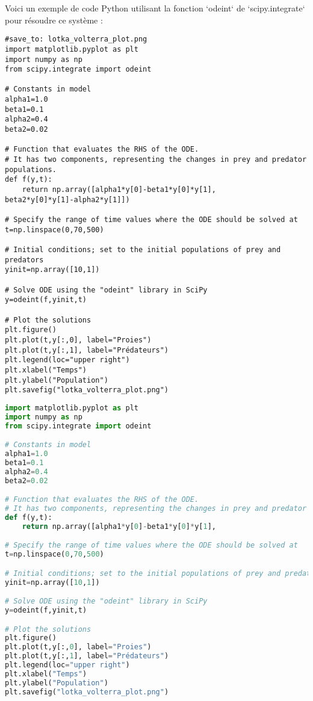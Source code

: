 \documentclass{article}
\begin{document}
Voici un exemple de code Python utilisant la fonction `odeint` de `scipy.integrate` pour résoudre ce système :
\begin{verbatim}
#save_to: lotka_volterra_plot.png
import matplotlib.pyplot as plt
import numpy as np
from scipy.integrate import odeint

# Constants in model
alpha1=1.0
beta1=0.1
alpha2=0.4
beta2=0.02

# Function that evaluates the RHS of the ODE.
# It has two components, representing the changes in prey and predator populations.
def f(y,t):
    return np.array([alpha1*y[0]-beta1*y[0]*y[1],                      beta2*y[0]*y[1]-alpha2*y[1]])

# Specify the range of time values where the ODE should be solved at
t=np.linspace(0,70,500)

# Initial conditions; set to the initial populations of prey and predators
yinit=np.array([10,1])

# Solve ODE using the "odeint" library in SciPy
y=odeint(f,yinit,t)

# Plot the solutions
plt.figure()
plt.plot(t,y[:,0], label="Proies")
plt.plot(t,y[:,1], label="Prédateurs")
plt.legend(loc="upper right")
plt.xlabel("Temps")
plt.ylabel("Population")
plt.savefig("lotka_volterra_plot.png")
\end{verbatim}
\begin{lstlisting}[language=Python, caption=Code Python pour le modèle Lotka-Volterra, label=code:lotka_volterra]
import matplotlib.pyplot as plt
import numpy as np
from scipy.integrate import odeint

# Constants in model
alpha1=1.0
beta1=0.1
alpha2=0.4
beta2=0.02

# Function that evaluates the RHS of the ODE.
# It has two components, representing the changes in prey and predator populations.
def f(y,t):
    return np.array([alpha1*y[0]-beta1*y[0]*y[1],                      beta2*y[0]*y[1]-alpha2*y[1]])

# Specify the range of time values where the ODE should be solved at
t=np.linspace(0,70,500)

# Initial conditions; set to the initial populations of prey and predators
yinit=np.array([10,1])

# Solve ODE using the "odeint" library in SciPy
y=odeint(f,yinit,t)

# Plot the solutions
plt.figure()
plt.plot(t,y[:,0], label="Proies")
plt.plot(t,y[:,1], label="Prédateurs")
plt.legend(loc="upper right")
plt.xlabel("Temps")
plt.ylabel("Population")
plt.savefig("lotka_volterra_plot.png")
\end{lstlisting}
\end{document}
